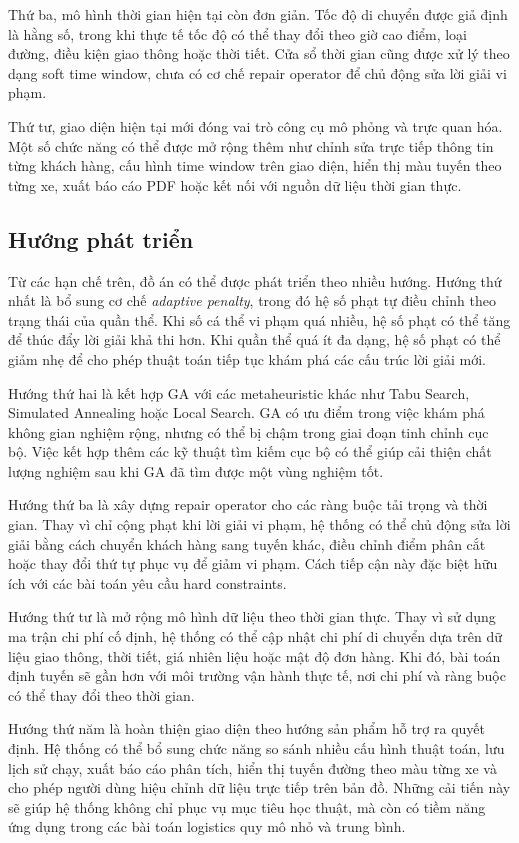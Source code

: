 \documentclass[12pt,a4paper]{article}
\numberwithin{figure}{subsection}
\begin{document}
Thứ ba, mô hình thời gian hiện tại còn đơn giản. Tốc độ di chuyển được giả định là hằng số, trong khi thực tế tốc độ có thể thay đổi theo giờ cao điểm, loại đường, điều kiện giao thông hoặc thời tiết. Cửa sổ thời gian cũng được xử lý theo dạng soft time window, chưa có cơ chế repair operator để chủ động sửa lời giải vi phạm.

Thứ tư, giao diện hiện tại mới đóng vai trò công cụ mô phỏng và trực quan hóa. Một số chức năng có thể được mở rộng thêm như chỉnh sửa trực tiếp thông tin từng khách hàng, cấu hình time window trên giao diện, hiển thị màu tuyến theo từng xe, xuất báo cáo PDF hoặc kết nối với nguồn dữ liệu thời gian thực.

\subsection{Hướng phát triển}

Từ các hạn chế trên, đồ án có thể được phát triển theo nhiều hướng. Hướng thứ nhất là bổ sung cơ chế \textit{adaptive penalty}, trong đó hệ số phạt tự điều chỉnh theo trạng thái của quần thể. Khi số cá thể vi phạm quá nhiều, hệ số phạt có thể tăng để thúc đẩy lời giải khả thi hơn. Khi quần thể quá ít đa dạng, hệ số phạt có thể giảm nhẹ để cho phép thuật toán tiếp tục khám phá các cấu trúc lời giải mới.

Hướng thứ hai là kết hợp GA với các metaheuristic khác như Tabu Search, Simulated Annealing hoặc Local Search. GA có ưu điểm trong việc khám phá không gian nghiệm rộng, nhưng có thể bị chậm trong giai đoạn tinh chỉnh cục bộ. Việc kết hợp thêm các kỹ thuật tìm kiếm cục bộ có thể giúp cải thiện chất lượng nghiệm sau khi GA đã tìm được một vùng nghiệm tốt.

Hướng thứ ba là xây dựng repair operator cho các ràng buộc tải trọng và thời gian. Thay vì chỉ cộng phạt khi lời giải vi phạm, hệ thống có thể chủ động sửa lời giải bằng cách chuyển khách hàng sang tuyến khác, điều chỉnh điểm phân cắt hoặc thay đổi thứ tự phục vụ để giảm vi phạm. Cách tiếp cận này đặc biệt hữu ích với các bài toán yêu cầu hard constraints.

Hướng thứ tư là mở rộng mô hình dữ liệu theo thời gian thực. Thay vì sử dụng ma trận chi phí cố định, hệ thống có thể cập nhật chi phí di chuyển dựa trên dữ liệu giao thông, thời tiết, giá nhiên liệu hoặc mật độ đơn hàng. Khi đó, bài toán định tuyến sẽ gần hơn với môi trường vận hành thực tế, nơi chi phí và ràng buộc có thể thay đổi theo thời gian.

Hướng thứ năm là hoàn thiện giao diện theo hướng sản phẩm hỗ trợ ra quyết định. Hệ thống có thể bổ sung chức năng so sánh nhiều cấu hình thuật toán, lưu lịch sử chạy, xuất báo cáo phân tích, hiển thị tuyến đường theo màu từng xe và cho phép người dùng hiệu chỉnh dữ liệu trực tiếp trên bản đồ. Những cải tiến này sẽ giúp hệ thống không chỉ phục vụ mục tiêu học thuật, mà còn có tiềm năng ứng dụng trong các bài toán logistics quy mô nhỏ và trung bình.
\end{document}
